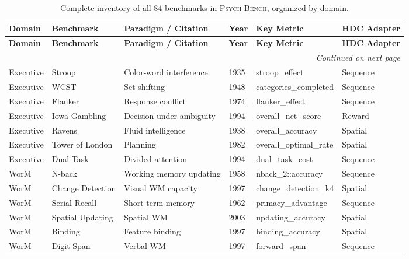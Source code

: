 \documentclass[10pt,landscape]{article}
\newcommand{\psychbench}{\textsc{Psych-Bench}}
\begin{document}
\renewcommand{\arraystretch}{1.15}
\begin{longtable}{@{}p{2.3cm}p{3.0cm}p{4.5cm}p{0.6cm}p{3.8cm}p{1.8cm}@{}}
\caption{Complete inventory of all 84 benchmarks in \psychbench{}, organized by domain.} \label{tab:s1} \\
\toprule
\textbf{Domain} & \textbf{Benchmark} & \textbf{Paradigm / Citation} & \textbf{Year} & \textbf{Key Metric} & \textbf{HDC Adapter} \\
\midrule
\endfirsthead
\toprule
\textbf{Domain} & \textbf{Benchmark} & \textbf{Paradigm / Citation} & \textbf{Year} & \textbf{Key Metric} & \textbf{HDC Adapter} \\
\midrule
\endhead
\midrule
\multicolumn{6}{r}{\emph{Continued on next page}} \\
\endfoot
\bottomrule
\endlastfoot

Executive & Stroop & Color-word interference \citep{stroop1935interference} & 1935 & stroop\_effect & Sequence \\
Executive & WCST & Set-shifting \citep{berg1948simple} & 1948 & categories\_completed & Sequence \\
Executive & Flanker & Response conflict \citep{eriksen1974effects} & 1974 & flanker\_effect & Sequence \\
Executive & Iowa Gambling & Decision under ambiguity \citep{bechara1994insensitivity} & 1994 & overall\_net\_score & Reward \\
Executive & Ravens & Fluid intelligence \citep{raven1938progressive} & 1938 & overall\_accuracy & Spatial \\
Executive & Tower of London & Planning \citep{shallice1982specific} & 1982 & overall\_optimal\_rate & Spatial \\
Executive & Dual-Task & Divided attention \citep{pashler1994dual} & 1994 & dual\_task\_cost & Sequence \\

\midrule
WorM & N-back & Working memory updating \citep{jaeggi2010relationship} & 1958 & nback\_2::accuracy & Sequence \\
WorM & Change Detection & Visual WM capacity \citep{luck1997capacity} & 1997 & change\_detection\_k4 & Spatial \\
WorM & Serial Recall & Short-term memory \citep{murdock1962serial} & 1962 & primacy\_advantage & Sequence \\
WorM & Spatial Updating & Spatial WM \citep{oberauer2003selective} & 2003 & updating\_accuracy & Spatial \\
WorM & Binding & Feature binding \citep{luck1997capacity} & 1997 & binding\_accuracy & Spatial \\
WorM & Digit Span & Verbal WM \citep{wechsler2008wais} & 1997 & forward\_span & Sequence \\


\end{longtable}
\end{document}
